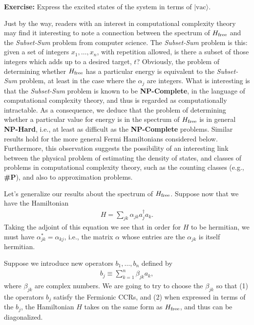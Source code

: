 \documentclass[12pt]{article}
\begin{document}
{\textbf{Exercise:} Express the excited states of the system in terms
of $|\mbox{vac}\rangle$.

Just by the way, readers with an interest in computational complexity
theory may find it interesting to note a connection between the
spectrum of $H_{\rm free}$ and the \emph{Subset-Sum} problem from
computer science.  The \emph{Subset-Sum} problem is this: given a set
of integers $x_1,\ldots,x_n$, with repetition allowed, is there a
subset of those integers which adds up to a desired target, $t$?
Obviously, the problem of determining whether $H_{\rm free}$ has a
particular energy is equivalent to the \emph{Subset-Sum} problem, at
least in the case where the $\alpha_j$ are integers.  What is
interesting is that the \emph{Subset-Sum} problem is known to be
\textbf{NP-Complete}, in the language of computational complexity
theory, and thus is regarded as computationally intractable.  As a
consequence, we deduce that the problem of determining whether a
particular value for energy is in the spectrum of $H_{\rm free}$ is in
general \textbf{NP-Hard}, i.e., at least as difficult as the
\textbf{NP-Complete} problems.  Similar results hold for the more
general Fermi Hamiltonians considered below.  Furthermore, this
observation suggests the possibility of an interesting link between
the physical problem of estimating the density of states, and classes
of problems in computational complexity theory, such as the counting
classes (e.g., \textbf{\#P}), and also to approximation problems.

Let's generalize our results about the spectrum of $H_{\rm free}$.
Suppose now that we have the Hamiltonian
\begin{eqnarray}
  H = \sum_{jk} \alpha_{jk} a_j^\dagger a_k. 
\end{eqnarray}
Taking the adjoint of this equation we see that in order for $H$ to be
hermitian, we must have $\alpha_{jk}^* = \alpha_{kj}$, i.e., the
matrix $\alpha$ whose entries are the $\alpha_{jk}$ is itself
hermitian.

Suppose we introduce new operators $b_1,\ldots,b_n$ defined by
\begin{eqnarray}
  b_j \equiv \sum_{k=1}^n \beta_{jk} a_k,
\end{eqnarray}
where $\beta_{jk}$ are complex numbers.  We are going to try to choose
the $\beta_{jk}$ so that (1) the operators $b_j$ satisfy the Fermionic
CCRs, and (2) when expressed in terms of the $b_j$, the Hamiltonian
$H$ takes on the same form as $H_{\rm free}$, and thus can be
diagonalized.

}
\end{document}
